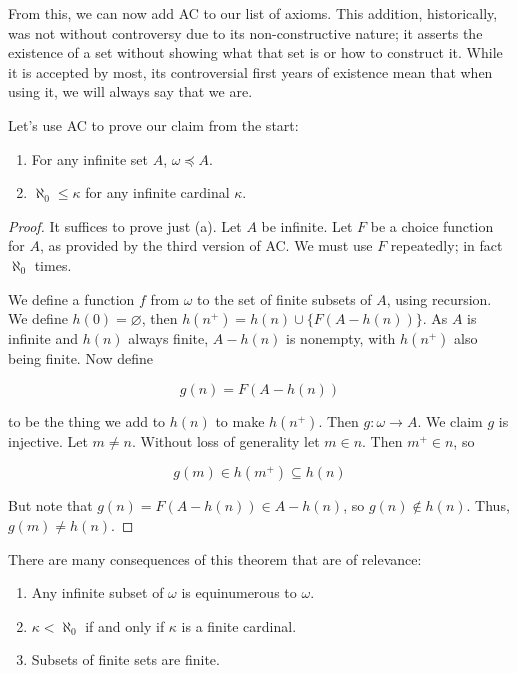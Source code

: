 From this, we can now add AC to our list of axioms. This addition, historically, was not without controversy due to its non-constructive nature; it asserts the existence of a set without showing what that set is or how to construct it. While it is accepted by most, its controversial first years of existence mean that when using it, we will always say that we are.

Let's use AC to prove our claim from the start:

\begin{theorem}
    \begin{enumerate}[label=(\alph*)]
        \item For any infinite set $A$, $\omega \preceq A$. 
        \item $\aleph_0 \leq \kappa$ for any infinite cardinal $\kappa$. 
    \end{enumerate}
\end{theorem}

\begin{proof}
    It suffices to prove just (a). Let $A$ be infinite. Let $F$ be a choice function for $A$, as provided by the third version of AC. We must use $F$ repeatedly; in fact $\aleph_0$ times. 

    We define a function $f$ from $\omega$ to the set of finite subsets of $A$, using recursion. We define $h(0) = \varnothing$, then $h(n^+) = h(n) \cup \{F(A - h(n))\}$. As $A$ is infinite and $h(n)$ always finite, $A - h(n)$ is nonempty, with $h(n^+)$ also being finite. Now define 

    \[g(n) = F(A - h(n))\]

    to be the thing we add to $h(n)$ to make $h(n^+)$. Then $g: \omega \to A$. We claim $g$ is injective. Let $m \neq n$. Without loss of generality let $m \in n$. Then $m^+ \in n$, so 

    \[g(m) \in h(m^+) \subseteq h(n)\]

    But note that $g(n) = F(A - h(n)) \in A - h(n)$, so $g(n) \notin h(n)$. Thus, $g(m) \neq h(n)$. 
\end{proof}

There are many consequences of this theorem that are of relevance:

\begin{enumerate}
    \item Any infinite subset of $\omega$ is equinumerous to $\omega$.
    \item $\kappa < \aleph_0$ if and only if $\kappa$ is a finite cardinal. 
    \item Subsets of finite sets are finite. 
\end{enumerate}

